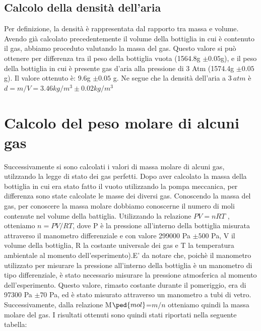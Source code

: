 \documentclass[a4paper,11pt]{article}
\begin{document}
\subsection{Calcolo della densità dell'aria}
Per definizione, la densità è rappresentata dal rapporto tra massa e volume. Avendo già calcolato precedentemente il volume della bottiglia in cui è contenuto il gas, abbiamo proceduto valutando la massa del gas. Questo valore si può ottenere per differenza tra il peso della bottiglia vuota (1564.8g $\pm 0.05$g), e il peso della bottiglia in cui è presente gas d'aria alla pressione di 3 Atm (1574.4g $\pm 0.05$g).\newpage
 Il valore ottenuto è: 9.6g $\pm 0.05$ g.
Ne segue che la densità dell'aria a $3 ~atm$ è  $d= m/V= 3.46 kg/m^3 \pm 0.02kg/m^3$  

\section{Calcolo del peso molare di alcuni gas}
Successivamente si sono calcolati i valori di massa molare di alcuni gas, utilzzando la legge di stato dei gas perfetti.
Dopo aver calcolato la massa della bottiglia in cui era stato fatto il vuoto utilizzando la pompa meccanica, per differenza sono state calcolate le masse dei diversi gas.
Conoscendo la massa del gas, per conoscere la massa molare dobbiamo conoscerne il numero di moli contenute nel volume della battiglia. Utilizzando la relazione $PV=nRT$ , otteniamo $n=PV/RT$, dove P è la pressione all'interno della bottiglia misurata attraverso il manometro differenziale e con valore 299000 Pa $\pm500$ Pa, V il volume della bottiglia, R la costante universale dei gas e T la temperatura ambientale al momento dell'esperimento).E' da notare che, poichè il manometro utilizzato per misurare la pressione all'interno della bottiglia è un manometro di tipo differenziale, è stato necessario misurare la pressione atmosferica al momento dell'esperimento. Questo valore, rimasto costante durante il pomeriggio, era di 97300 Pa $\pm70$ Pa, ed è stato misurato attraverso un manometro a tubi di vetro. Successivamente, dalla relazione M$\ped{mol}$=$m/n$ otteniamo quindi la massa molare del gas. I risultati ottenuti sono quindi stati riportati nella seguente tabella: 
\hspace{-140pt}
\end{document}
